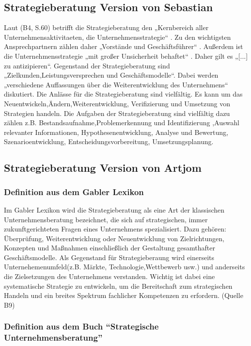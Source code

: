 \subsection{Strategieberatung Version von Sebastian}
Laut (B4, S.60) betrifft die Strategieberatung den „Kernbereich aller Unternehmensaktivitaeten, die Unternehmensstrategie“ . Zu den wichtigsten Ansprechpartnern zählen daher „Vorstände und Geschäftsführer“ . Außerdem ist die Unternehmensstrategie „mit großer Unsicherheit behaftet“ . Daher gilt es „[...] zu antizipieren“.  Gegenstand der Strategieberatung sind „Zielkunden,Leistungsversprechen und Geschäftsmodelle“. Dabei werden „verschiedene Auffassungen über die Weiterentwicklung des Unternehmens“ diskutiert.
Die Anlässe für die Strategieberatung sind vielfältig. Es kann um das Neuentwickeln,Ändern,Weiterentwicklung, Verifizierung und Umsetzung von Strategien handeln.
Die Aufgaben der Strategieberatung sind vielfältig dazu zählen z.B. Bestandsaufnahme,Problemerkennung und Identifizierung ,Auswahl relevanter Informationen, Hypothesenentwicklung, Analyse und Bewertung, Szenarioentwicklung, Entscheidungsvorbereitung, Umsetzungsplanung.

\subsection{Strategieberatung Version von Artjom}

\subsubsection{Definition aus dem Gabler Lexikon}

Im Gabler Lexikon wird die Strategieberatung als eine Art der klassischen Unternehmensberatung bezeichnet, die sich auf strategischen, immer zukunftgerichteten Fragen eines Unternehmens spezialisiert. Dazu gehören: Überprüfung, Weiterentwicklung oder Neuentwicklung von Zielrichtungen, Konzepten und Maßnahmen einschließlich der Gestaltung gesamthafter Geschäftsmodelle. Als Gegenstand für Strategieberaung wird einerseits Unternehemenumfeld(z.B. Märkte, Technologie,Wettbewerb usw.) und anderseits die Zielsetzungen des Unternehmens verstanden. Wichtig ist dabei eine systematische Strategie zu entwickeln, um die Bereitschaft zum strategischen Handeln und ein breites Spektrum fachlicher Kompetenzen zu erfordern. (Quelle B9)

\subsubsection{Definition aus dem Buch “Strategische Unternehmensberatung”}

